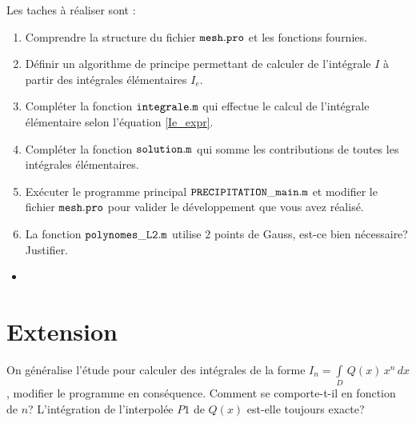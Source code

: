 \documentclass[a4paper, 10pt]{article}
\newcommand{\matlabscript}[2]
  {\begin{itemize}\item[]\end{itemize}}
\begin{document}
Les taches à réaliser sont :

\begin{enumerate}
\item  Comprendre la structure du fichier $\tt{mesh.pro} \rm$ et les fonctions fournies.
\item Définir un algorithme de principe permettant de calculer de l'intégrale $I$ à partir
des intégrales élémentaires $I_e$.
\item Compléter la fonction $\tt{integrale.m} \rm$ qui effectue le calcul de l'intégrale élémentaire
selon l'équation \eqref{Ie_expr}.
\item Compléter la fonction  $\tt{solution.m} \rm$ qui somme les contributions de toutes les intégrales
élémentaires.
\item Exécuter le programme principal $\tt{PRECIPITATION\_main.m} \rm$ et modifier le fichier 
$\tt{mesh.pro} \rm$ pour valider le développement que vous avez réalisé.
\item  La fonction $\tt{polynomes\_L2.m} \rm$ utilise $2$ points de Gauss, est-ce bien nécessaire?
Justifier.
\end{enumerate} 

\matlabscript{PRECIPITATION_main}{programme principal}

\section {Extension}

On généralise l'étude pour calculer des intégrales de la forme $I_n=\int\limits_{D}\, Q(x)\, x^n\, dx$,
modifier le programme en conséquence. Comment se comporte-t-il en fonction de $n$? L'intégration de l'interpolée $P1$ de $Q(x)$ est-elle toujours exacte?
\end{document}
